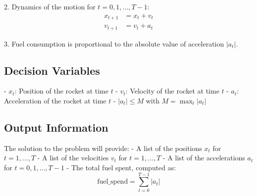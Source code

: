 \documentclass{article}
\begin{document}
2. Dynamics of the motion for \( t = 0, 1, \ldots, T-1 \):
   \begin{align*}
       x_{t+1} &= x_t + v_t \\
       v_{t+1} &= v_t + a_t
   \end{align*}

3. Fuel consumption is proportional to the absolute value of acceleration \( |a_t| \).

\subsection*{Decision Variables}

- \( x_t \): Position of the rocket at time \( t \)
- \( v_t \): Velocity of the rocket at time \( t \)
- \( a_t \): Acceleration of the rocket at time \( t \)
- \( |a_t| \leq M \) with \( M = \max_t |a_t| \)

\subsection*{Output Information}

The solution to the problem will provide:
- A list of the positions \( x_t \) for \( t = 1, \ldots, T \)
- A list of the velocities \( v_t \) for \( t = 1, \ldots, T \)
- A list of the accelerations \( a_t \) for \( t = 0, 1, \ldots, T-1 \)
- The total fuel spent, computed as:
  \[
  \text{fuel\_spend} = \sum_{t=0}^{T-1} |a_t|
  \]
\end{document}
